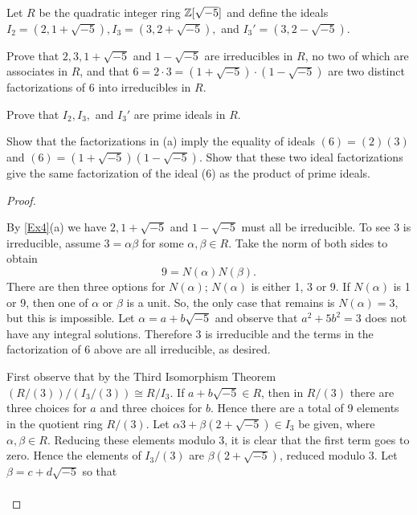 \documentclass[10pt]{amsart}
\begin{document}
\begin{thm}
  \label{Ex5}
  Let $R$ be the quadratic integer ring $\mathbb{Z}[\sqrt{-5}]$ and define the ideals $I_2 = (2, 1 + \sqrt{-5}), I_3 = (3, 2 + \sqrt{-5}),$ and $I_3' = (3,2 - \sqrt{-5})$.
  \begin{alphaenum}
  \item
    Prove that $2,3, 1 + \sqrt{-5}$ and $1 - \sqrt{-5}$ are irreducibles in $R$, no two of which are associates in $R$, and that $6 = 2{\cdot}3 = (1+\sqrt{-5}) \cdot (1 - \sqrt{-5})$ are two distinct factorizations of 6 into irreducibles in $R$.
  \item
    Prove that $I_2, I_3,$ and $I_3'$ are prime ideals in $R$.
  \item
    Show that the factorizations in (a) imply the equality of ideals $(6) = (2)(3)$ and $(6) = (1+\sqrt{-5})(1-\sqrt{-5}).$  
    Show that these two ideal factorizations give the same factorization of the ideal (6) as the product of prime ideals.
  \end{alphaenum}
  \begin{proof}
    \begin{alphaenum}
    \item
      By \ref{Ex4}(a) we have $2, 1+\sqrt{-5}$ and $1 - \sqrt{-5}$ must all be irreducible.
      To see 3 is irreducible, assume $3 = \alpha\beta$ for some $\alpha,\beta\in R$.
      Take the norm of both sides to obtain $$9 = N(\alpha)N(\beta).$$
      There are then three options for $N(\alpha)$;  $N(\alpha)$ is either 1, 3 or 9.
      If $N(\alpha)$ is 1 or 9, then one of $\alpha$ or $\beta$ is a unit.
      So, the only case that remains is $N(\alpha) = 3$, but this is impossible.
      Let $\alpha = a + b\sqrt{-5}$ and observe that $a^2 + 5b^2 = 3$ does not have any integral solutions. 
      Therefore 3 is irreducible and the terms in the factorization of 6 above are all irreducible, as desired.
    \item
      First observe that by the Third Isomorphism Theorem $(R/(3))/(I_3/(3)) \cong R/I_3$.
      If $a + b\sqrt{-5} \in R$, then in $R/(3)$ there are three choices for $a$ and three choices for $b$.
      Hence there are a total of 9 elements in the quotient ring $R/(3)$.
      Let $\alpha 3 + \beta(2 + \sqrt{-5}) \in I_3$ be given, where $\alpha, \beta \in R$.
      Reducing these elements modulo 3, it is clear that the first term goes to zero.
      Hence the elements of $I_3/(3)$ are $\beta(2  +\sqrt{-5})$, reduced modulo 3.
      Let $\beta = c + d\sqrt{-5}$ so that 
      \begin{align*}

\end{align*}
\end{alphaenum}
\end{proof}
\end{thm}
\end{document}
